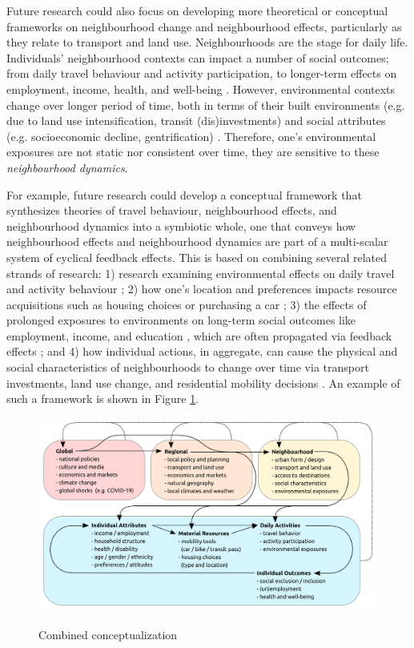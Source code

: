 Future research could also focus on developing more theoretical or conceptual frameworks on neighbourhood change and neighbourhood effects, particularly as they relate to transport and land use. Neighbourhoods are the stage for daily life. Individuals' neighbourhood contexts can impact a number of social outcomes; from daily travel behaviour and activity participation, to longer-term effects on employment, income, health, and well-being \cite{sampson_assessing_2002,ewing_travel_2010,lucas_transport_2012,bastiaanssen_does_2020}. However, environmental contexts change over longer period of time, both in terms of their built environments (e.g. due to land use intensification, transit (dis)investments) and social attributes (e.g. socioeconomic decline, gentrification) \cite{van_ham_understanding_2013,wegener_land-use_2004}. Therefore, one's environmental exposures are not static nor consistent over time, they are sensitive to these \textit{neighbourhood dynamics}. 

For example, future research could develop a conceptual framework that synthesizes theories of travel behaviour, neighbourhood effects, and neighbourhood dynamics into a symbiotic whole, one that conveys how neighbourhood effects and neighbourhood dynamics are part of a multi-scalar system of cyclical feedback effects. This is based on combining several related strands of research: 1) research examining environmental effects on daily travel and activity behaviour \cite{hanson_determinants_1982,ewing_travel_2010}; 2) how one's location and preferences impacts resource acquisitions such as housing choices or purchasing a car \cite{lee_neighborhood_1994,klein_millennials_2017}; 3) the effects of prolonged exposures to environments on long-term social outcomes like employment, income, and education \cite{sampson_assessing_2002,chetty_effects_2016}, which are often propagated via feedback effects \cite{wilson_truly_2012,lucas_transport_2012}; and 4) how individual actions, in aggregate, can cause the physical and social characteristics of neighbourhoods to change over time via transport investments, land use change, and residential mobility decisions \cite{wegener_land-use_2004,wilson_truly_2012,van_ham_understanding_2013}. An example of such a framework is shown in Figure \ref{fig:conceptual}.

\begin{figure}[H]
	\caption{{Combined conceptualization}}
	\includegraphics[width=6in]{figures/my_idea.png}
	\centering
	\label{fig:conceptual}
\end{figure}


